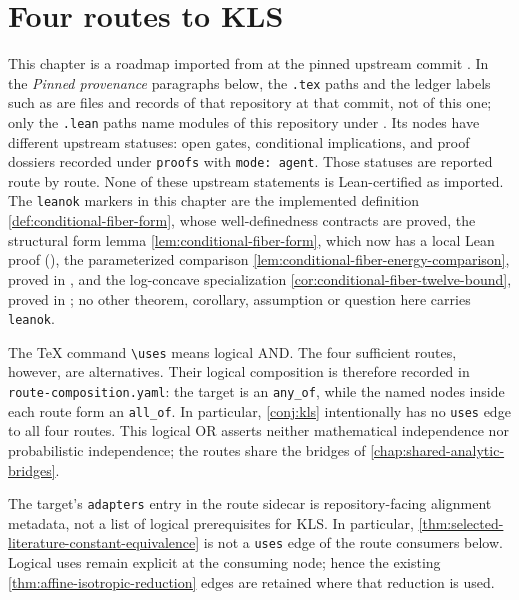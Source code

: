 \chapter{Four routes to KLS}
\label{chap:kls-routes}

This chapter is a roadmap imported from \sourcerepository{} at the pinned upstream commit
\sourcecommit.  In the \emph{Pinned provenance} paragraphs below, the \texttt{.tex} paths and
the ledger labels such as  are files and records of that
repository at that commit, not of this one; only the \texttt{.lean} paths name modules of this
repository under .  Its nodes have
different upstream statuses: open gates, conditional implications, and proof dossiers recorded under
\texttt{proofs} with \texttt{mode: agent}.  Those statuses are reported route by route.  None of
these upstream statements is Lean-certified as imported.  The \texttt{leanok} markers in this
chapter are the implemented definition \cref{def:conditional-fiber-form}, whose well-definedness
contracts are proved, the structural form lemma \cref{lem:conditional-fiber-form}, which now has
a local Lean proof (), the parameterized comparison
\cref{lem:conditional-fiber-energy-comparison}, proved in
, and the log-concave specialization
\cref{cor:conditional-fiber-twelve-bound}, proved in
; no other theorem, corollary,
assumption or question here carries \texttt{leanok}.

The TeX command \texttt{\textbackslash uses} means logical AND.  The four sufficient routes,
however, are alternatives.  Their logical composition is therefore recorded in
\texttt{route-composition.yaml}: the target is an \texttt{any\_of}, while the named nodes inside
each route form an \texttt{all\_of}.  In particular, \cref{conj:kls} intentionally has no
\texttt{uses} edge to all four routes.  This logical OR asserts neither mathematical independence
nor probabilistic independence; the routes share the bridges of
\cref{chap:shared-analytic-bridges}.

The target's \texttt{adapters} entry in the route sidecar is repository-facing alignment
metadata, not a list of logical prerequisites for KLS.  In particular,
\cref{thm:selected-literature-constant-equivalence} is not a \texttt{uses} edge of the route
consumers below.  Logical uses remain explicit at the consuming node; hence the existing
\cref{thm:affine-isotropic-reduction} edges are retained where that reduction is used.

